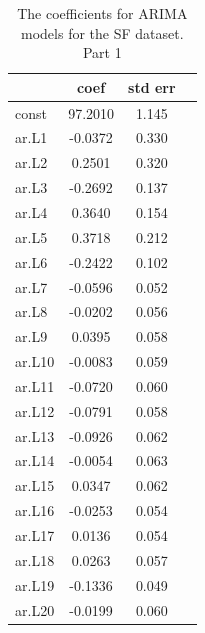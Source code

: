 \documentclass[12pt,a4paper]{article}
\theoremstyle{myplain}
\numberwithin{equation}{section}
\begin{document}
\newpage

\begin{table}[h!]
\label{tab:table9}
\begin{center}
\begin{tabular}{|l|c|c|c|}
\hline
 & coef  &  std err \\
\hline
const     &    97.2010   &   1.145 \\
\hline
ar.L1     &     -0.0372    &  0.330 \\
\hline
ar.L2     &     0.2501    &  0.320 \\
\hline
ar.L3     &    -0.2692   &   0.137 \\
\hline
ar.L4     &     0.3640  &    0.154 \\
\hline
ar.L5     &     0.3718 &     0.212 \\
\hline
ar.L6     &    -0.2422     & 0.102 \\
\hline
ar.L7     &    -0.0596    &  0.052 \\
\hline
ar.L8     &     -0.0202    &  0.056 \\
\hline
ar.L9     &    0.0395     & 0.058 \\
\hline
ar.L10    &    -0.0083   &   0.059 \\
\hline
ar.L11    &     -0.0720    &  0.060 \\
\hline
ar.L12    &    -0.0791    &  0.058 \\
\hline
ar.L13    &    -0.0926   &   0.062 \\
\hline
ar.L14    &     -0.0054 &     0.063 \\
\hline
ar.L15    &    0.0347  &    0.062 \\
\hline
ar.L16    &    -0.0253    &  0.054 \\
\hline
ar.L17    &     0.0136   &   0.054 \\
\hline
ar.L18    &    0.0263   &   0.057 \\
\hline
ar.L19    &    -0.1336     & 0.049 \\
\hline
ar.L20    &    -0.0199    &  0.060 \\
\hline
\end{tabular}
\end{center}
\caption{The coefficients for ARIMA models for the SF dataset. Part 1}
\end{table}
\end{document}
